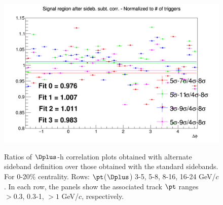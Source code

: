 \begin{figure}
{\includegraphics[width=0.31\linewidth]{Centrality_DPlus/Dplus/Systematic/0_20/Side_band_0_20/Ratio_AzimCorrDistr_Dplus_Canvas_PtIntBins11to11_PoolInt_thr1dotto99dot.png}} \\
 \caption{Ratios of $\Dplus$-h correlation plots obtained with alternate sideband definition over those obtained with the standard sidebands. For 0-20\% centrality. Rows: $\pt$($\Dplus$) 3-5, 5-8, 8-16, 16-24 GeV/$c$. In each row, the panels show the associated track $\pt$ ranges $> 0.3$, 0.3-1, $> 1$ GeV/$c$, respectively.}
\label{fig:SysBkg020_Dplus}
\end{figure}

